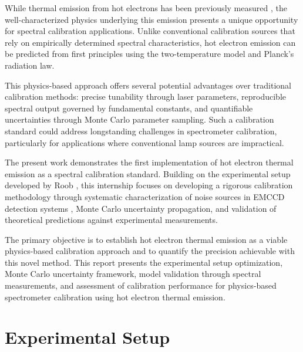 \documentclass[
	parskip=half,
	a4paper,
]{scrarticle}
\begin{document}
While thermal emission from hot electrons has been previously measured \cite{lui_ultrafast_2010}, the well-characterized physics underlying this emission presents a unique opportunity for spectral calibration applications. Unlike conventional calibration sources that rely on empirically determined spectral characteristics, hot electron emission can be predicted from first principles using the two-temperature model and Planck's radiation law.

This physics-based approach offers several potential advantages over traditional calibration methods: precise tunability through laser parameters, reproducible spectral output governed by fundamental constants, and quantifiable uncertainties through Monte Carlo parameter sampling. Such a calibration standard could address longstanding challenges in spectrometer calibration, particularly for applications where conventional lamp sources are impractical.

The present work demonstrates the first implementation of hot electron thermal emission as a spectral calibration standard. Building on the experimental setup developed by Roob \cite{roob_thermal_2025}, this internship focuses on developing a rigorous calibration methodology through systematic characterization of noise sources in EMCCD detection systems \cite{andor_establishing_nodate, dr_jo_walters_sensitivity_2023}, Monte Carlo uncertainty propagation, and validation of theoretical predictions against experimental measurements.

The primary objective is to establish hot electron thermal emission as a viable physics-based calibration approach and to quantify the precision achievable with this novel method. This report presents the experimental setup optimization, Monte Carlo uncertainty framework, model validation through spectral measurements, and assessment of calibration performance for physics-based spectrometer calibration using hot electron thermal emission.

\section{Experimental Setup}
\end{document}
